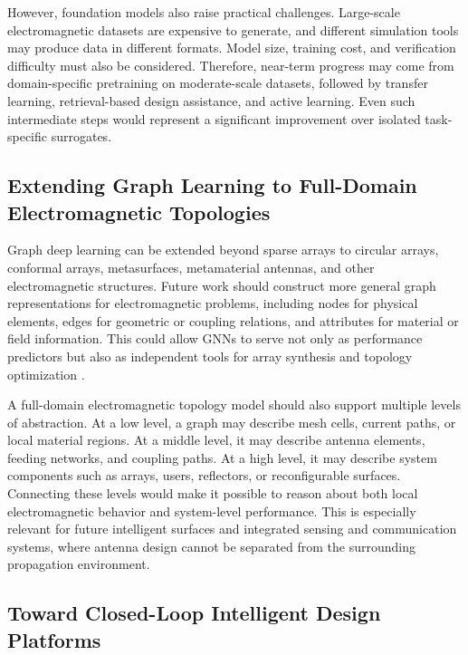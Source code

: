 \documentclass{article}
\begin{document}
However, foundation models also raise practical challenges. Large-scale electromagnetic datasets are expensive to generate, and different simulation tools may produce data in different formats. Model size, training cost, and verification difficulty must also be considered. Therefore, near-term progress may come from domain-specific pretraining on moderate-scale datasets, followed by transfer learning, retrieval-based design assistance, and active learning. Even such intermediate steps would represent a significant improvement over isolated task-specific surrogates.

\subsection{Extending Graph Learning to Full-Domain Electromagnetic Topologies}

Graph deep learning can be extended beyond sparse arrays to circular arrays, conformal arrays, metasurfaces, metamaterial antennas, and other electromagnetic structures. Future work should construct more general graph representations for electromagnetic problems, including nodes for physical elements, edges for geometric or coupling relations, and attributes for material or field information. This could allow GNNs to serve not only as performance predictors but also as independent tools for array synthesis and topology optimization \cite{su2024gnn}.

A full-domain electromagnetic topology model should also support multiple levels of abstraction. At a low level, a graph may describe mesh cells, current paths, or local material regions. At a middle level, it may describe antenna elements, feeding networks, and coupling paths. At a high level, it may describe system components such as arrays, users, reflectors, or reconfigurable surfaces. Connecting these levels would make it possible to reason about both local electromagnetic behavior and system-level performance. This is especially relevant for future intelligent surfaces and integrated sensing and communication systems, where antenna design cannot be separated from the surrounding propagation environment.

\subsection{Toward Closed-Loop Intelligent Design Platforms}
\end{document}
